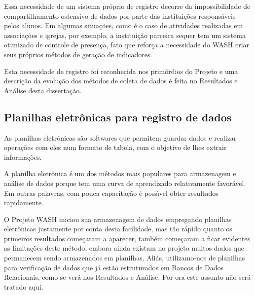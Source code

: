 \documentclass[
12pt,		%
openright,	%
twoside,  %
a4paper,			%
chapter=TITLE,		%
english,			%
french,				%
spanish,			%
brazil				%
]{USPSC-classe/USPSC}
\begin{document}
Essa necessidade de um sistema pr\'oprio de registro decorre da impossibilidade de compartilhamento ostensivo de dados por parte das institui\c{c}\~oes respons\'aveis pelos alunos. Em algumas situa\c{c}\~oes, como \'e o caso de atividades realizadas em associa\c{c}\~oes e igrejas, por exemplo, a institui\c{c}\~ao parceira sequer tem um sistema otimizado de controle de presen\c{c}a, fato que refor\c{c}a a necessidade do WASH criar seus pr\'oprios m\'etodos de gera\c{c}\~ao de indicadores.










Esta necessidade de registro foi reconhecida nos prim\'ordios do Projeto e uma descri\c{c}\~ao da evolu\c{c}\~ao dos m\'etodos de coleta de dados \'e feita no Resultados e An\'alise desta disserta\c{c}\~ao.










\subsection[Planilhas eletr\^onicas para registro de dados]{Planilhas eletr\^onicas para registro de dados}\label{Planilhas eletr\^onicas para registro de dados}
As planilhas eletr\^onicas s\~ao softwares que permitem guardar  dados e realizar opera\c{c}\~oes com eles num formato de tabela, com o objetivo de lhes extrair informa\c{c}\~oes.










A planilha eletr\^onica \'e um dos m\'etodos mais populares para armazenagem e an\'alise de dados porque tem uma curva de aprendizado relativamente favor\'avel. Em outras palavras, com pouca capacita\c{c}\~ao \'e poss\'{\i}vel obter resultados rapidamente.










O Projeto WASH iniciou sua armazenagem de dados empregando planilhas eletr\^onicas justamente por conta desta facilidade, mas t\~ao r\'apido quanto os primeiros resultados come\c{c}aram a aparecer, tamb\'em come\c{c}aram a ficar evidentes as limita\c{c}\~oes deste m\'etodo, embora ainda existam no projeto muitos dados que permanecem sendo armazenados em planilhas. Ali\'as, utilizamo-nos de planilhas para verifica\c{c}\~ao de dados que j\'a est\~ao estruturados em Bancos de Dados Relacionais, como se ver\'a nos Resultados e An\'alise. Por ora este assunto n\~ao ser\'a tratado aqui.
\end{document}

